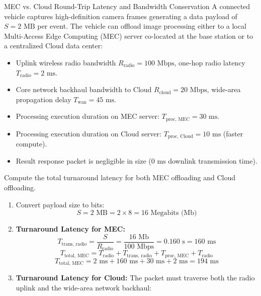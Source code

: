 \begin{solved}{MEC vs. Cloud Round-Trip Latency and Bandwidth Conservation}
\Given A connected vehicle captures high-definition camera frames generating a data payload of $S = 2\text{ MB}$ per event. The vehicle can offload image processing either to a local Multi-Access Edge Computing (MEC) server co-located at the base station or to a centralized Cloud data center:
\begin{itemize}[leftmargin=*]
  \item Uplink wireless radio bandwidth $R_{\text{radio}} = 100\text{ Mbps}$, one-hop radio latency $T_{\text{radio}} = 2\text{ ms}$.
  \item Core network backhaul bandwidth to Cloud $R_{\text{cloud}} = 20\text{ Mbps}$, wide-area propagation delay $T_{\text{wan}} = 45\text{ ms}$.
  \item Processing execution duration on MEC server: $T_{\text{proc, MEC}} = 30\text{ ms}$.
  \item Processing execution duration on Cloud server: $T_{\text{proc, Cloud}} = 10\text{ ms}$ (faster compute).
  \item Result response packet is negligible in size ($0\text{ ms}$ downlink transmission time).
\end{itemize}
Compute the total turnaround latency for both MEC offloading and Cloud offloading.
\Steps
\begin{enumerate}[leftmargin=*]
  \item Convert payload size to bits:
  \begin{equation}
  S = 2\text{ MB} = 2 \times 8 = 16\text{ Megabits (Mb)}
  \end{equation}
  \item \textbf{Turnaround Latency for MEC:}
  \begin{equation}
  T_{\text{trans, radio}} = \frac{S}{R_{\text{radio}}} = \frac{16\text{ Mb}}{100\text{ Mbps}} = 0.160\text{ s} = 160\text{ ms}
  \end{equation}
  \begin{equation}
  T_{\text{total, MEC}} = T_{\text{radio}} + T_{\text{trans, radio}} + T_{\text{proc, MEC}} + T_{\text{radio}}
  \end{equation}
  \begin{equation}
  T_{\text{total, MEC}} = 2\text{ ms} + 160\text{ ms} + 30\text{ ms} + 2\text{ ms} = 194\text{ ms}
  \end{equation}
  \item \textbf{Turnaround Latency for Cloud:}
  The packet must traverse both the radio uplink and the wide-area network backhaul:

\end{enumerate}
\end{solved}
